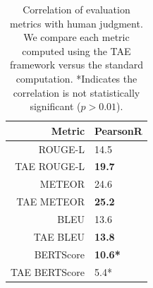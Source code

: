 \begin{table}
\centering
\small
\begin{tabular}{r|l}
Metric & PearsonR \\ \hline
ROUGE-L & 14.5 \\ 
TAE ROUGE-L & \textbf{19.7} \\
\hdashline[0.5pt/3pt]
METEOR & 24.6 \\ 
TAE METEOR & \textbf{25.2} \\
\hdashline[0.5pt/3pt]
BLEU & 13.6 \\ 
TAE BLEU & \textbf{13.8} \\
\hdashline[0.5pt/3pt]
BERTScore & \textbf{10.6*} \\
TAE BERTScore & 5.4* \\ 
\end{tabular}
\caption[Correlation of evaluation metrics with human judgment.]{Correlation of evaluation metrics with human judgment. We compare each metric computed using the TAE framework versus the standard computation. *Indicates the correlation is not statistically significant ($p>0.01$).}
\label{tbl:correlation}
\end{table}
